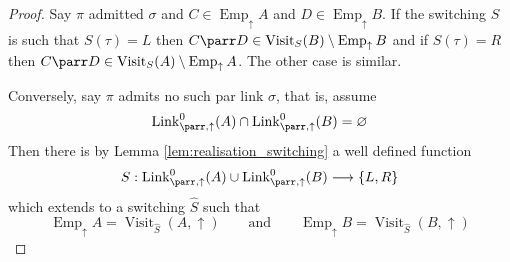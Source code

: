 \documentclass[12pt]{article}
\theoremstyle{plain}
\theoremstyle{definition}
\newcommand{\lto}{\longrightarrow}
\begin{document}
\begin{proof}
Say $\pi$ admitted $\sigma$ and $C \in \operatorname{Emp}_{\uparrow}A$ and $D \in \operatorname{Emp}_{\uparrow}B$. If the switching $S$ is such that $S(\tau) = L$ then $C \parr D \in \operatorname{Visit}_S(B)\setminus \operatorname{Emp}_{\uparrow}B$ and if $S(\tau) = R$ then $C \parr D \in \operatorname{Visit}_S(A) \setminus \operatorname{Emp}_{\uparrow}A$. The other case is similar.

Conversely, say $\pi$ admits no such par link $\sigma$, that is, assume
\begin{equation}
    \operatorname{Link}^0_{\parr,\uparrow}(A) \cap \operatorname{Link}^0_{\parr,\uparrow}(B) = \varnothing
\end{equation}
Then there is by Lemma \ref{lem:realisation_switching} a well defined function $$S: \operatorname{Link}_{\parr,\uparrow}^0(A) \cup \operatorname{Link}^0_{\parr,\uparrow}(B) \lto \lbrace L, R \rbrace$$ which extends to a switching $\hat{S}$ such that
\begin{equation}
    \operatorname{Emp}_{\uparrow}A = \operatorname{Visit}_{\hat{S}}(A,\uparrow)\qquad\text{and}\qquad \operatorname{Emp}_{\uparrow}B = \operatorname{Visit}_{\hat{S}}(B,\uparrow)
\end{equation}
\end{proof}
\end{document}
